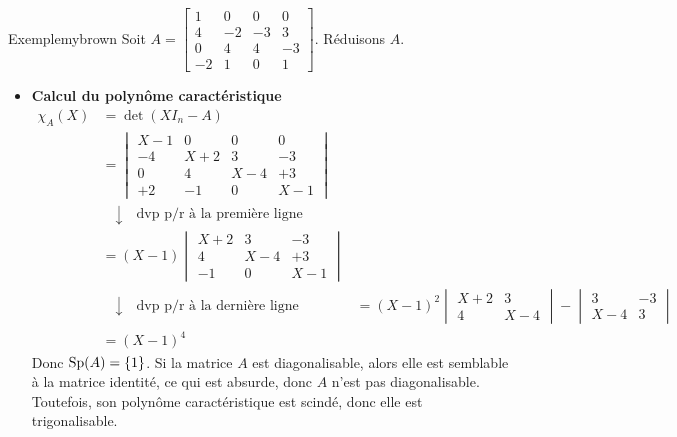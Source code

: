     \begin{omed}{Exemple}{mybrown}
        Soit $A = \begin{bmatrix}
            1 & 0 & 0 & 0 \\
            4 & -2 & -3 & 3 \\
            0 & 4 & 4 & -3 \\
            -2 & 1 & 0 & 1
        \end{bmatrix}$. Réduisons $A$.
        \begin{itemize}
            \item \textbf{Calcul du polynôme caractéristique} \quad 
            \begin{align*}
                \chi_A(X)
                &= \det(X I_n - A) \\
                &= \begin{vmatrix}
                    X - 1 & 0 & 0 & 0 \\
                    - 4 & X + 2 & 3 & -3 \\
                    0 & 4 & X - 4 & + 3 \\
                    +2 & -1 & 0 & X - 1
                \end{vmatrix} \\
                &\quad \downarrow \quad \text{dvp p/r à la première ligne} \\
                &= (X-1) \begin{vmatrix}
                    X + 2 & 3 & -3 \\
                    4 & X - 4 & + 3 \\
                    -1 & 0 & X - 1
                \end{vmatrix} \\
                &\quad \downarrow \quad \text{dvp p/r à la dernière ligne}
                &= (X-1)^2 \begin{vmatrix}
                    X + 2 & 3 \\
                    4 & X - 4
                \end{vmatrix} - \begin{vmatrix}
                    3 & - 3 \\
                    X - 4 & 3
                \end{vmatrix} \\
                &= (X - 1)^4
            \end{align*}
            Donc $\operatorname{Sp}(A) = \left\{1\right\}$. Si la matrice $A$ est diagonalisable, alors elle est semblable à la matrice identité, ce qui est absurde, donc $A$ n’est pas diagonalisable. Toutefois, son polynôme caractéristique est scindé, donc elle est trigonalisable.

\end{itemize}
\end{omed}
